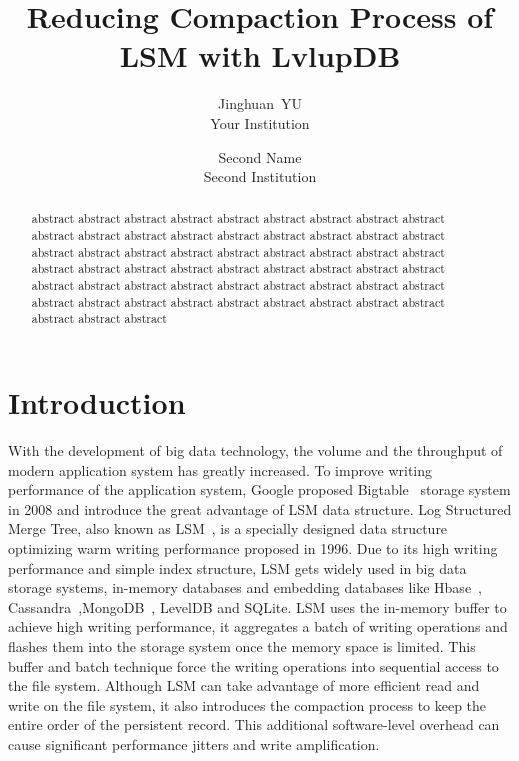\documentclass[letterpaper,twocolumn,10pt]{article}
\begin{document}
\date{}

\title{\Large \bf Reducing Compaction Process of LSM with LvlupDB}

\author{
    {\rm Jinghuan\ YU}\\
    Your Institution
    \and
    {\rm Second Name}\\
    Second Institution
} %

\maketitle

\begin{abstract}
    abstract abstract abstract abstract abstract abstract abstract abstract abstract abstract abstract abstract abstract abstract abstract abstract abstract abstract abstract abstract abstract abstract abstract abstract abstract abstract abstract abstract abstract abstract abstract abstract abstract abstract abstract abstract abstract abstract abstract abstract abstract abstract abstract abstract abstract abstract abstract abstract abstract abstract abstract abstract abstract abstract abstract abstract abstract
\end{abstract}

\section{Introduction}

With the development of big data technology, the volume and the throughput of modern application system has greatly increased. To improve writing performance of the application system, Google proposed Bigtable~\cite{chang2008bigtable} storage system in 2008 and introduce the great advantage of LSM data structure. Log Structured Merge Tree, also known as LSM~\cite{LSM_ori}, is a specially designed data structure optimizing warm writing performance proposed in 1996. Due to its high writing performance and simple index structure, LSM gets widely used in big data storage systems, in-memory databases and embedding databases like Hbase~\cite{ApacheHB8:online}, Cassandra~\cite{ApacheCa91:online},MongoDB~\cite{MongoDBD83:online}, LevelDB and SQLite. LSM uses the in-memory buffer to achieve high writing performance, it aggregates a batch of writing operations and flashes them into the storage system once the memory space is limited. This buffer and batch technique force the writing operations into sequential access to the file system. Although LSM can take advantage of more efficient read and write on the file system, it also introduces the compaction process to keep the entire order of the persistent record. This additional software-level overhead can cause significant performance jitters and write amplification.
\end{document}

